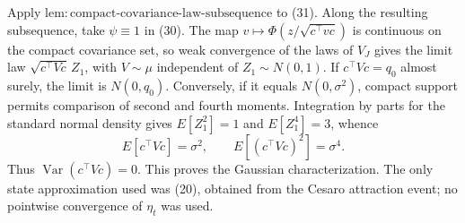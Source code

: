 Apply \(\mathrm{lem:compact\text{-}covariance\text{-}law\text{-}subsequence}\)
to (31).  Along the resulting subsequence, take \(\psi\equiv1\) in (30).
The map \(v\mapsto\Phi(z/\sqrt{c^\top vc})\) is continuous on the compact
covariance set, so weak convergence of the laws of \(V_J\) gives the limit
law \(\sqrt{c^\top Vc}\,Z_1\), with \(V\sim\mu\) independent of
\(Z_1\sim N(0,1)\).  If \(c^\top Vc=q_0\) almost surely, the limit is
\(N(0,q_0)\).  Conversely, if it equals \(N(0,\sigma^2)\), compact support
permits comparison of second and fourth moments.  Integration by parts for
the standard normal density gives \(E[Z_1^2]=1\) and \(E[Z_1^4]=3\), whence
\[
 E[c^\top Vc]=\sigma^2,
 \qquad E[(c^\top Vc)^2]=\sigma^4.
\tag{32}
\]
Thus \(\operatorname{Var}(c^\top Vc)=0\).  This proves the Gaussian
characterization.  The only state approximation used was (20), obtained
from the Cesaro attraction event; no pointwise convergence of \(\eta_t\)
was used.